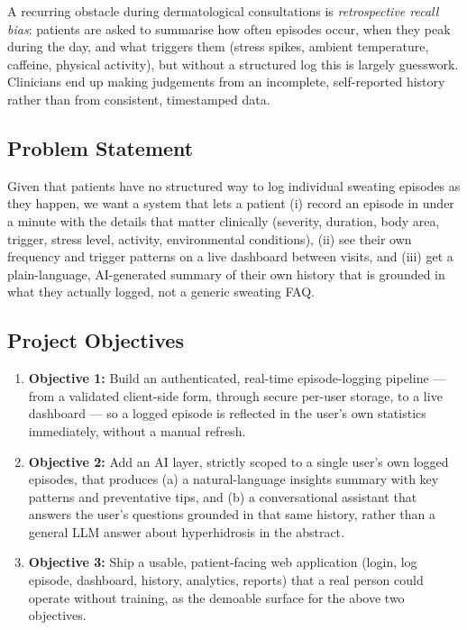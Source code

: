 \documentclass[11pt,a4paper]{article}
\begin{document}
A recurring obstacle during dermatological consultations is \emph{retrospective recall bias}:
patients are asked to summarise how often episodes occur, when they peak during the day, and
what triggers them (stress spikes, ambient temperature, caffeine, physical activity), but
without a structured log this is largely guesswork. Clinicians end up making judgements from an
incomplete, self-reported history rather than from consistent, timestamped data.

\subsection{Problem Statement}
Given that patients have no structured way to log individual sweating episodes as they happen,
we want a system that lets a patient (i) record an episode in under a minute with the details
that matter clinically (severity, duration, body area, trigger, stress level, activity,
environmental conditions), (ii) see their own frequency and trigger patterns on a live
dashboard between visits, and (iii) get a plain-language, AI-generated summary of their own
history that is grounded in what they actually logged, not a generic sweating FAQ.

\subsection{Project Objectives}
\begin{enumerate}
    \item \textbf{Objective 1:} Build an authenticated, real-time episode-logging pipeline —
    from a validated client-side form, through secure per-user storage, to a live dashboard —
    so a logged episode is reflected in the user's own statistics immediately, without a manual
    refresh.
    \item \textbf{Objective 2:} Add an AI layer, strictly scoped to a single user's own logged
    episodes, that produces (a) a natural-language insights summary with key patterns and
    preventative tips, and (b) a conversational assistant that answers the user's questions
    grounded in that same history, rather than a general LLM answer about hyperhidrosis in
    the abstract.
    \item \textbf{Objective 3:} Ship a usable, patient-facing web application (login, log
    episode, dashboard, history, analytics, reports) that a real person could operate without
    training, as the demoable surface for the above two objectives.
\end{enumerate}
\end{document}
